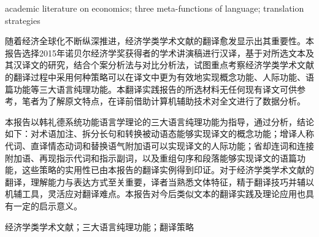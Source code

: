 \vspace{1em}
\textbf{\heiti{}}
academic literature on economics; three meta-functions of language; translation strategies

\newpage
{}
\vspace*{2em}
\begin{spacing}{0.95}
	\centering
	\sanhao\textbf{}
	\vspace{2mm}
	\ifx\subtitle\undefined\else
	\begin{spacing}{1.2}
		\sihao\selectfont{\textmd{\kaishu{-----}\rmfamily\textbf{\ensubtitle}}}
	\end{spacing}
	\fi
\end{spacing}
\vspace{1em}
\setlength{\parskip}{0em}

随着经济全球化不断纵深推进，经济学类学术文献的翻译愈发显示出其重要性。本报告选择2015年诺贝尔经济学奖获得者的学术讲演稿进行汉译，基于对所选文本及其汉译文的研究，结合个案分析法与对比分析法，试图重点考察经济学类学术文献的翻译过程中采用何种策略可以在译文中更为有效地实现概念功能、人际功能、语篇功能等三大语言纯理功能。本翻译实践报告的所选材料无任何现有译文可供参考，笔者为了解原文特点，在译前借助计算机辅助技术对全文进行了数据分析。
\par
本报告以韩礼德系统功能语言学理论的三大语言纯理功能为指导，通过分析，结论如下：对术语加注、拆分长句和转换被动语态能够实现译文的概念功能；增译人称代词、直译情态动词和替换语气附加语可以实现译文的人际功能；省却连词和连接附加语、再现指示代词和指示副词，以及重组句序和段落能够实现译文的语篇功能，这些策略的实用性已由本报告的翻译实例得到印证。对于经济学类学术文献的翻译，理解能力与表达方式至关重要，译者当熟悉文体特征，精于翻译技巧并辅以机辅工具，灵活应对翻译难点。本报告对今后类似文本的翻译实践及理论应用也具有一定的启示意义。
\par

\vspace{1em}
\textbf{\rmfamily{}}
经济学类学术文献；三大语言纯理功能；翻译策略


\newpage

